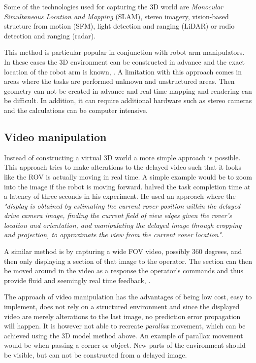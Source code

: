 Some of the technologies used for capturing the 3D world are \textit{Monocular Simultaneous Location and Mapping} (SLAM), stereo imagery, vision-based structure from motion (SFM), light detection and ranging (LiDAR) or radio detection and ranging (radar).

This method is particular popular in conjunction with robot arm manipulators. In these cases the 3D environment can be constructed in advance and the exact location of the robot arm is known, \citep{Ricks2004}. A limitation with this approach comes in areas where the tasks are performed unknown and unstructured areas. Then geometry can not be created in advance and real time mapping and rendering can be difficult. In addition, it can require additional hardware such as stereo cameras and the calculations can be computer intensive.



\subsection{Video manipulation}

Instead of constructing a virtual 3D world a more simple approach is possible. This approach tries to make alterations to the delayed video such that it looks like the ROV is actually moving in real time. A simple example would be to zoom into the image if the robot is moving forward. \citep{Matheson2013} halved the task completion time at a latency of three seconds in his experiment. He used an approach where the \textit{"display is obtained by estimating the current rover position within the delayed drive camera image, finding the current field of view edges given the rover’s location and orientation, and manipulating the delayed image through cropping and projection, to approximate the view from the current rover location".}

A similar method is by capturing a wide FOV video, possibly 360 degrees, and then only displaying a section of that image to the operator. The section can then be moved around in the video as a response the operator's commands and thus provide fluid and seemingly real time feedback, \citep{Baldwin1999}.

The approach of video manipulation has the advantages of being low cost, easy to implement, does not rely on a structured environment and since the displayed video are merely alterations to the last image, no prediction error propagation will happen. It is however not able to recreate \textit{parallax} movement, which can be achieved using the 3D model method above. An example of parallax movement would be when passing a corner or object. New parts of the environment should be visible, but can not be constructed from a delayed image.

